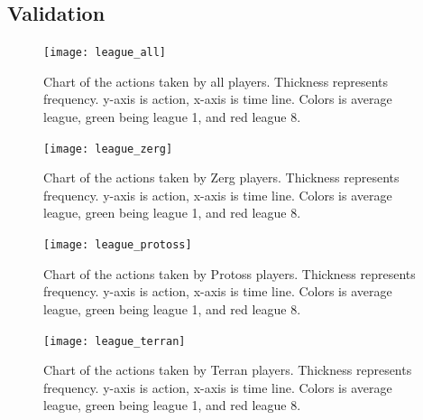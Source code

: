 \documentclass[a4paper,11pt]{article}
\begin{document}
  \subsection{Validation}
  \begin{figure}[H]
    \centering
    \texttt{[image: league\_all]}
    \caption{Chart of the actions taken by all players. Thickness represents frequency. y-axis is action, x-axis is time line. Colors is average league, green being league 1, and red league 8.}
  \end{figure}
  \begin{figure}[H]
    \centering
    \texttt{[image: league\_zerg]}
    \caption{Chart of the actions taken by Zerg players. Thickness represents frequency. y-axis is action, x-axis is time line. Colors is average league, green being league 1, and red league 8.}
  \end{figure}
  \begin{figure}[H]
    \centering
    \texttt{[image: league\_protoss]}
    \caption{Chart of the actions taken by Protoss players. Thickness represents frequency. y-axis is action, x-axis is time line. Colors is average league, green being league 1, and red league 8.}
  \end{figure}
  \begin{figure}[H]
    \centering
    \texttt{[image: league\_terran]}
    \caption{Chart of the actions taken by Terran players. Thickness represents frequency. y-axis is action, x-axis is time line. Colors is average league, green being league 1, and red league 8.}
  \end{figure}

%
\end{document}
